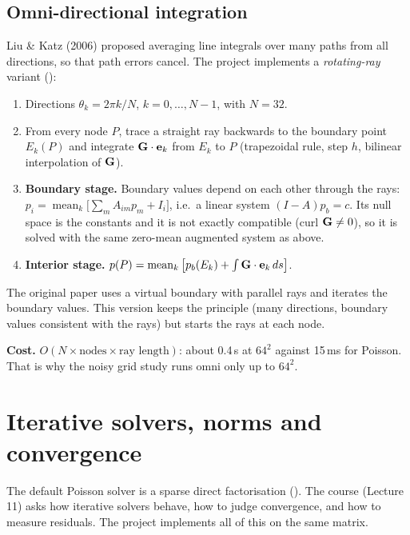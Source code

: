 \section{Omni-directional integration}
Liu \& Katz (2006) proposed averaging line integrals over many paths from all directions, so that path errors cancel. The project implements a \emph{rotating-ray} variant ():
\begin{enumerate}
\item Directions $\theta_k=2\pi k/N$, $k=0,\dots,N-1$, with $N=32$.
\item From every node $P$, trace a straight ray backwards to the boundary point $E_k(P)$ and integrate $\mathbf{G}\cdot\mathbf e_k$ from $E_k$ to $P$ (trapezoidal rule, step $h$, bilinear interpolation of $\mathbf{G}$).
\item \textbf{Boundary stage.} Boundary values depend on each other through the rays: $p_i=\operatorname{mean}_k\big[\sum_mA_{im}p_m+I_i\big]$, i.e.\ a linear system $(I-A)p_b=c$. Its null space is the constants and it is not exactly compatible (curl $\mathbf{G}\neq0$), so it is solved with the same zero-mean augmented system as above.
\item \textbf{Interior stage.} $p(P)=\operatorname{mean}_k\big[p_b(E_k)+\int\mathbf{G}\cdot\mathbf e_k\,ds\big]$.
\end{enumerate}
The original paper uses a virtual boundary with parallel rays and iterates the boundary values. This version keeps the principle (many directions, boundary values consistent with the rays) but starts the rays at each node.

\textbf{Cost.} $O(N\times\text{nodes}\times\text{ray length})$: about 0.4\,s at $64^2$ against 15\,ms for Poisson. That is why the noisy grid study runs omni only up to $64^2$.

\chapter{Iterative solvers, norms and convergence}
The default Poisson solver is a sparse direct factorisation (). The course (Lecture 11) asks how iterative solvers behave, how to judge convergence, and how to measure residuals. The project implements all of this on the same matrix.

